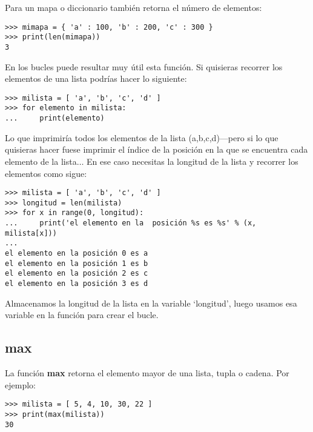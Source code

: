 \noindent
Para un mapa o diccionario también retorna el número de elementos:

\begin{listing}
\begin{verbatim}
>>> mimapa = { 'a' : 100, 'b' : 200, 'c' : 300 }
>>> print(len(mimapa))
3
\end{verbatim}
\end{listing}

\noindent
En los bucles puede resultar muy útil esta función. Si quisieras recorrer los elementos de una lista podrías hacer lo siguiente:

\begin{listing}
\begin{verbatim}
>>> milista = [ 'a', 'b', 'c', 'd' ]
>>> for elemento in milista:
...     print(elemento)
\end{verbatim}
\end{listing}

\noindent
Lo que imprimiría todos los elementos de la lista (a,b,c,d)---pero si lo que quisieras hacer fuese imprimir el índice de la posición en la que se encuentra cada elemento de la lista$\ldots$   En ese caso necesitas la longitud de la lista y recorrer los elementos como sigue:

\begin{listing}
\begin{verbatim}
>>> milista = [ 'a', 'b', 'c', 'd' ]
>>> longitud = len(milista)
>>> for x in range(0, longitud):
...     print('el elemento en la  posición %s es %s' % (x, milista[x]))
... 
el elemento en la posición 0 es a
el elemento en la posición 1 es b
el elemento en la posición 2 es c
el elemento en la posición 3 es d
\end{verbatim}
\end{listing}

\noindent
Almacenamos la longitud de la lista en la variable `longitud', luego usamos esa variable en la función  para crear el bucle.

\subsection*{max}

La función \textbf{max} retorna el elemento mayor de una lista, tupla o cadena.   Por ejemplo:

\begin{listing}
\begin{verbatim}
>>> milista = [ 5, 4, 10, 30, 22 ]
>>> print(max(milista))
30
\end{verbatim}
\end{listing}

